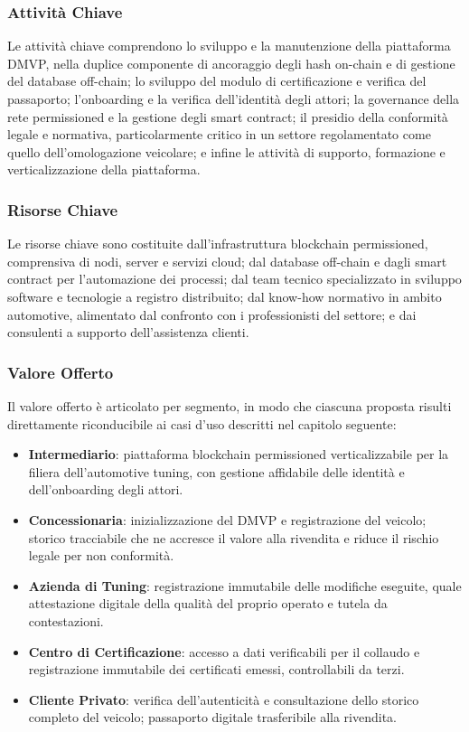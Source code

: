 \subsubsection*{Attività Chiave}

Le attività chiave comprendono lo sviluppo e la manutenzione della piattaforma DMVP, nella duplice componente di ancoraggio degli hash on-chain e di gestione del database off-chain; lo sviluppo del modulo di certificazione e verifica del passaporto; l'onboarding e la verifica dell'identità degli attori; la governance della rete permissioned e la gestione degli smart contract; il presidio della conformità legale e normativa, particolarmente critico in un settore regolamentato come quello dell'omologazione veicolare; e infine le attività di supporto, formazione e verticalizzazione della piattaforma.

\subsubsection*{Risorse Chiave}

Le risorse chiave sono costituite dall'infrastruttura blockchain permissioned, comprensiva di nodi, server e servizi cloud; dal database off-chain e dagli smart contract per l'automazione dei processi; dal team tecnico specializzato in sviluppo software e tecnologie a registro distribuito; dal know-how normativo in ambito automotive, alimentato dal confronto con i professionisti del settore; e dai consulenti a supporto dell'assistenza clienti.

\subsubsection*{Valore Offerto}

Il valore offerto è articolato per segmento, in modo che ciascuna proposta risulti direttamente riconducibile ai casi d'uso descritti nel capitolo seguente:

\begin{itemize}
    \item \textbf{Intermediario}: piattaforma blockchain permissioned verticalizzabile per la filiera dell'automotive tuning, con gestione affidabile delle identità e dell'onboarding degli attori.
    \item \textbf{Concessionaria}: inizializzazione del DMVP e registrazione del veicolo; storico tracciabile che ne accresce il valore alla rivendita e riduce il rischio legale per non conformità.
    \item \textbf{Azienda di Tuning}: registrazione immutabile delle modifiche eseguite, quale attestazione digitale della qualità del proprio operato e tutela da contestazioni.
    \item \textbf{Centro di Certificazione}: accesso a dati verificabili per il collaudo e registrazione immutabile dei certificati emessi, controllabili da terzi.
    \item \textbf{Cliente Privato}: verifica dell'autenticità e consultazione dello storico completo del veicolo; passaporto digitale trasferibile alla rivendita.
\end{itemize}

